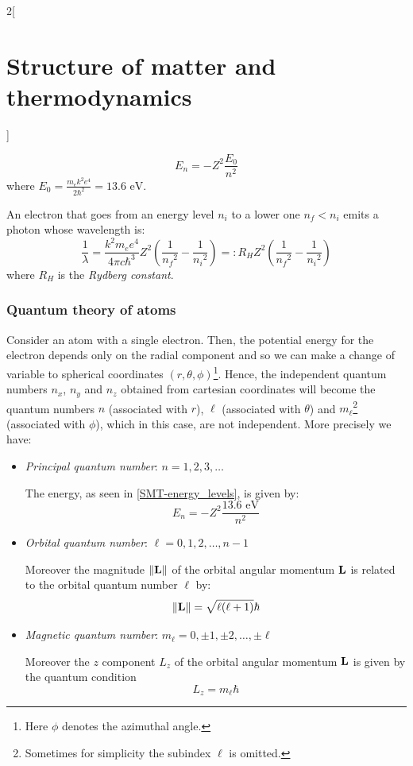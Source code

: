 \documentclass[../../../main.tex]{subfiles}
\begin{document}
\begin{multicols}{2}[\section{Structure of matter and thermodynamics}]
\begin{prop}
\begin{equation}
            E_n=-Z^2\frac{E_0}{n^2}
        \end{equation}
        where $E_0=\frac{m_ek^2e^4}{2\hbar^2}=13.6\text{ eV}$.
    \end{prop}
    \begin{prop}
        An electron that goes from an energy level $n_i$ to a lower one $n_f<n_i$ emits a photon whose wavelength is:
        $$\frac{1}{\lambda}=\frac{k^2m_ee^4}{4\pi c\hbar^3}Z^2\left(\frac{1}{{n_f}^2}-\frac{1}{{n_i}^2}\right)=:R_HZ^2\left(\frac{1}{{n_f}^2}-\frac{1}{{n_i}^2}\right)$$
        where $R_H$ is the \textit{Rydberg constant}.
    \end{prop}
    \subsubsection*{Quantum theory of atoms}
    \begin{definition}
        Consider an atom with a single electron. Then, the potential energy for the electron depends only on the radial component and so we can make a change of variable to spherical coordinates $(r,\theta,\phi)$\footnote{Here $\phi$ denotes the azimuthal angle.}. Hence, the independent quantum numbers $n_x$, $n_y$ and $n_z$ obtained from cartesian coordinates will become the quantum numbers $n$ (associated with $r$), $\ell$ (associated with $\theta$) and $m_\ell$\footnote{Sometimes for simplicity the subindex $\ell$ is omitted.} (associated with $\phi$), which in this case, are not independent. More precisely we have:
        \begin{itemize}
            \item \textit{Principal quantum number}: $n=1,2,3,\ldots$\par
                  The energy, as seen in \eqref{SMT-energy_levels}, is given by: $$E_n=-Z^2\frac{13.6\text{ eV}}{n^2}$$
            \item \textit{Orbital quantum number}: $\ell=0,1,2,\ldots,n-1$\par Moreover the magnitude $\|\boldsymbol{\mathrm{L}}\|$ of the orbital angular momentum $\boldsymbol{\mathrm{L}}$ is related to the orbital quantum number $\ell$ by: $$\|\boldsymbol{\mathrm{L}}\|=\sqrt{\ell(\ell+1)}\hbar$$
            \item \textit{Magnetic quantum number}: $m_\ell=0,\pm 1,\pm 2,\ldots,\pm\ell$\par
                  Moreover the $z$ component $L_z$ of the orbital angular momentum $\boldsymbol{\mathrm{L}}$ is given by the quantum condition $$L_z=m_\ell\hbar$$

\end{itemize}
\end{definition}
\end{multicols}
\end{document}
